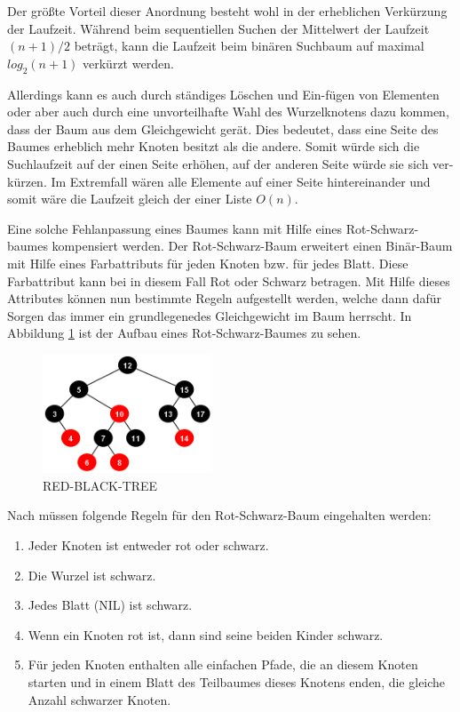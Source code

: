 Der größte Vorteil dieser Anordnung besteht wohl in der erheblichen Verkürzung der Laufzeit. Während beim sequentiellen Suchen der Mittelwert der Laufzeit $(n+1)/2$ beträgt, kann die Laufzeit beim binären Suchbaum auf maximal $log_2(n+1)$ verkürzt werden.

Allerdings kann es auch durch ständiges Löschen und Ein-fügen von Elementen oder aber auch durch eine unvorteilhafte Wahl des Wurzelknotens dazu kommen, dass der Baum aus dem Gleichgewicht gerät. Dies bedeutet, dass eine Seite des Baumes erheblich mehr Knoten besitzt als die andere. Somit würde sich die Suchlaufzeit auf der einen Seite erhöhen, auf der anderen Seite würde sie sich ver-kürzen. Im Extremfall wären alle Elemente auf einer Seite hintereinander und somit wäre die Laufzeit gleich der einer Liste $O(n)$.

Eine solche Fehlanpassung eines Baumes kann mit Hilfe eines Rot-Schwarz-baumes kompensiert werden.
Der Rot-Schwarz-Baum erweitert einen Binär-Baum mit Hilfe eines Farbattributs für jeden Knoten bzw. für jedes Blatt. Diese Farbattribut kann bei in diesem Fall Rot oder Schwarz betragen. Mit Hilfe dieses Attributes können nun bestimmte Regeln aufgestellt werden, welche dann dafür Sorgen das immer ein grundlegenedes Gleichgewicht im Baum herrscht. In Abbildung \ref{fig:rbtree} ist der Aufbau eines Rot-Schwarz-Baumes zu sehen.

\begin{figure}[h]
	\centering
	\includegraphics[width=0.45\textwidth]{pictures/redblacktree.png}
	\caption{RED-BLACK-TREE~\protect\cite{rtoal}}
	\label{fig:rbtree}
\end{figure}

 
Nach \cite[S.311]{tcormen} müssen folgende Regeln für den Rot-Schwarz-Baum eingehalten werden:

\begin{enumerate}
	\item Jeder Knoten ist entweder rot oder schwarz.
	\item Die Wurzel ist schwarz.
	\item Jedes Blatt (NIL) ist schwarz.
	\item Wenn ein Knoten rot ist, dann sind seine beiden Kinder schwarz.
	\item Für jeden Knoten enthalten alle einfachen Pfade, die an diesem Knoten starten und in einem Blatt des Teilbaumes dieses Knotens enden, die gleiche Anzahl schwarzer Knoten. 
\end{enumerate}


